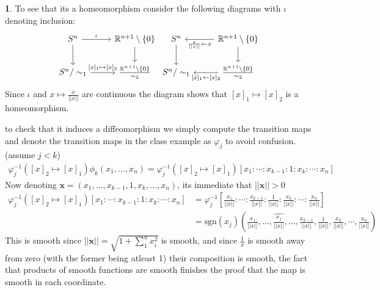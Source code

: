 \documentclass[10.5pt]{article}
\theoremstyle{definition}
\newtheorem{pb}{}
\newcommand{\set}[1]{\{#1\}}
\newcommand{\norm}[1]{\lvert\lvert#1\rvert\rvert}
\begin{document}
\begin{pb}
        To see that its a homeomorphism consider the following diagrams with \(\iota\) denoting inclusion:
        \begin{equation*}
            \begin{tikzcd}
                S^n \arrow[r,"{\iota}"] \arrow[d,"{}"] &\mathbb{R}^{n+1}\setminus\set{0} \arrow[d,"{}"] \\
                S^n/\sim_1 \arrow[r,"{[x]_1\mapsto [x]_2} "] & \frac{\mathbb{R}^{n+1}\setminus\set{0}}{\sim_2}
            \end{tikzcd}
            \begin{tikzcd}
                S^n  \arrow[d,"{}"] &\mathbb{R}^{n+1}\setminus\set{0} \arrow[d,"{}"]\arrow[l,"{\frac{x}{\norm{x}} \leftarrow x}"] \\
                S^n/\sim_1  & \frac{\mathbb{R}^{n+1}\setminus\set{0}}{\sim_2} \arrow[l,"{[x]_1\leftarrow [x]_2} "]
            \end{tikzcd}
        \end{equation*}
        Since \(\iota\) and \(x \mapsto \frac{x}{\norm{x}}\) are continuous the diagram shows that \([x]_1 \mapsto [x]_2\) is a homeomorphism.
        
        to check that it induces a diffeomorphism we simply compute the transition maps and denote the transition maps in the class example as \(\varphi_j\) to avoid confusion. (assume \(j < k\))
        \begin{align*}
            \varphi_j^{-1}([x]_2 \mapsto [x]_1)\phi_k(x_1,\hdots,x_n) = \varphi_j^{-1}([x]_2 \mapsto [x]_1)[x_1:\cdots:x_{k-1}:1:x_k:\cdots:x_n]
        \end{align*}
        Now denoting \(\mathbf{x} = (x_1,\hdots,x_{k-1},1,x_k,\hdots,x_n)\), its immediate that \(\norm{\mathbf{x}} > 0\)
        \begin{align*}
            \varphi_j^{-1}([x]_2 \mapsto [x]_1)[x_1:\cdots:x_{k-1}:1:x_k:\cdots:x_n] &= \varphi_j^{-1}\left[\frac{x_1}{\norm{x}}:\cdots:\frac{x_{k-1}}{\norm{x}}:\frac{1}{\norm{x}}:\frac{x_k}{\norm{x}}:\cdots:\frac{x_n}{\norm{x}}\right] \\
            &= \text{sgn}(x_j)\left(\frac{x_1}{\norm{x}},\hdots,\widehat{\frac{x_j}{\norm{x}}},\hdots,\frac{x_{k-1}}{\norm{x}},\frac{1}{\norm{x}},\frac{x_k}{\norm{x}},\cdots,\frac{x_n}{\norm{x}}\right)
        \end{align*}
        This is smooth since \(\norm{\mathbf{x}} = \sqrt{1 + \sum_1^n x_i^2}\) is smooth, and since \(\frac{1}{x}\) is smooth away from zero (with the former being atleast 1) their composition is smooth, the fact that products of smooth functions are smooth finishes the proof that the map is smooth in each coordinate.


\end{pb}
\end{document}
